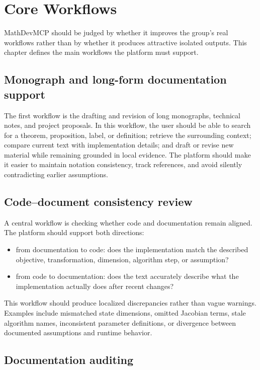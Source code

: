 \chapter{Core Workflows}

MathDevMCP should be judged by whether it improves the group's real workflows rather than by whether it produces attractive isolated outputs. This chapter defines the main workflows the platform must support.

\section{Monograph and long-form documentation support}

The first workflow is the drafting and revision of long monographs, technical notes, and project proposals. In this workflow, the user should be able to search for a theorem, proposition, label, or definition; retrieve the surrounding context; compare current text with implementation details; and draft or revise new material while remaining grounded in local evidence. The platform should make it easier to maintain notation consistency, track references, and avoid silently contradicting earlier assumptions.

\section{Code--document consistency review}

A central workflow is checking whether code and documentation remain aligned. The platform should support both directions:

\begin{itemize}
  \item from documentation to code: does the implementation match the described objective, transformation, dimension, algorithm step, or assumption?
  \item from code to documentation: does the text accurately describe what the implementation actually does after recent changes?
\end{itemize}

This workflow should produce localized discrepancies rather than vague warnings. Examples include mismatched state dimensions, omitted Jacobian terms, stale algorithm names, inconsistent parameter definitions, or divergence between documented assumptions and runtime behavior.

\section{Documentation auditing}


